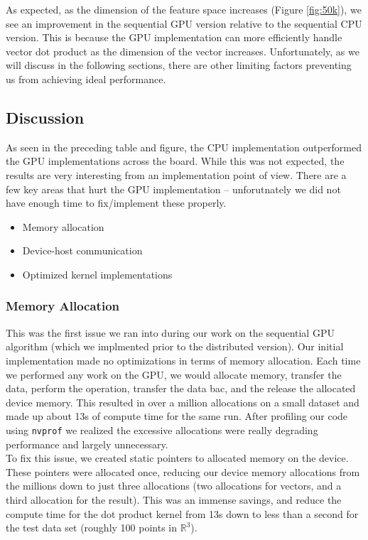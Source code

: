 \documentclass{article}
\def \R {\mathbb{R}}
\def \R {\mathbb{R}}
\begin{document}
As expected, as the dimension of the feature space increases (Figure
\ref{fig:50k}), we see an improvement in the sequential GPU version relative to
the sequential CPU version. This is because the GPU implementation can more
efficiently handle vector dot product as the dimension of the vector
increases. Unfortunately, as we will discuss in the following sections, there
are other limiting factors preventing us from achieving ideal performance.
  
\subsection{Discussion}
As seen in the preceding table and figure, the CPU implementation outperformed
the GPU implementations across the board. While this was not expected, the
results are very interesting from an implementation point of view. There are a
few key areas that hurt the GPU implementation -- unforutnately we did not have
enough time to fix/implement these properly.
\begin{itemize}
    \item Memory allocation
    \item Device-host communication
    \item Optimized kernel implementations
\end{itemize}

\subsubsection{Memory Allocation}
This was the first issue we ran into during our work on the sequential GPU
algorithm (which we implmented prior to the distributed version). Our initial
implementation made no optimizations in terms of memory allocation. Each time
we performed any work on the GPU, we would allocate memory, transfer the data,
perform the operation, transfer the data bac, and the release the allocated
device memory. This resulted in over a million allocations on a small dataset
and made up about 13s of compute time for the same run. After profiling our
code using \texttt{nvprof} we realized the excessive allocations were really
degrading performance and largely unnecessary.\\

To fix this issue, we created static
pointers to allocated memory on the device. These pointers were allocated once,
reducing our device memory allocations from the millions down to just three
allocations (two allocations for vectors, and a third allocation for the
result). This was an immense savings, and reduce the compute time for the dot
product kernel from 13s down to less than a second for the test data set
(roughly 100 points in $\R^3$).\\
\end{document}

